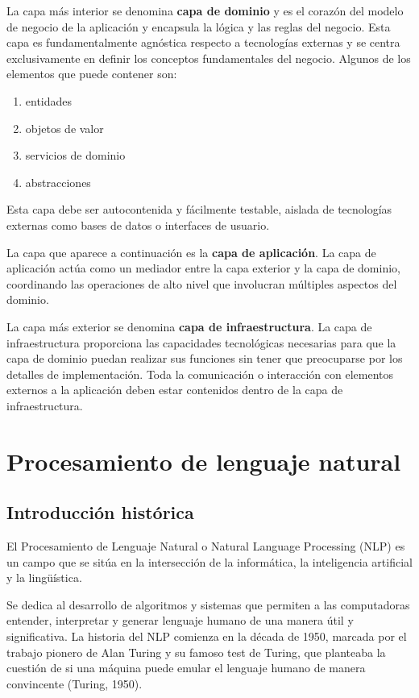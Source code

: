 La capa más interior se denomina \textbf{capa de dominio} y es el corazón del modelo de negocio de la aplicación y
encapsula la lógica y las reglas del negocio.
Esta capa es fundamentalmente agnóstica respecto a tecnologías externas y se centra exclusivamente en definir los
conceptos fundamentales del negocio.
Algunos de los elementos que puede contener son:
\begin{enumerate}
    \item entidades
    \item objetos de valor
    \item servicios de dominio
    \item abstracciones
\end{enumerate}

Esta capa debe ser autocontenida y fácilmente testable, aislada de tecnologías externas como bases de datos o
interfaces de usuario.

La capa que aparece a continuación es la \textbf{capa de aplicación}.
La capa de aplicación actúa como un mediador entre la capa exterior y la capa de dominio, coordinando las operaciones
de alto nivel que involucran múltiples aspectos del dominio.

La capa más exterior se denomina \textbf{capa de infraestructura}.
La capa de infraestructura proporciona las capacidades tecnológicas necesarias para que la capa de dominio puedan
realizar sus funciones sin tener que preocuparse por los detalles de implementación.
Toda la comunicación o interacción con elementos externos a la aplicación deben estar contenidos dentro de la capa de
infraestructura.


\section{Procesamiento de lenguaje natural}

\subsection{Introducción histórica}
El Procesamiento de Lenguaje Natural o Natural Language Processing (NLP) es un campo que se sitúa en la
intersección de la informática, la inteligencia artificial y la lingüística.

Se dedica al desarrollo de algoritmos y sistemas que permiten a las computadoras entender, interpretar y generar
lenguaje humano de una manera útil y significativa.
La historia del NLP comienza en la década de 1950, marcada por el trabajo pionero de Alan Turing y su famoso
test de Turing, que planteaba la cuestión de si una máquina puede emular el lenguaje humano de manera convincente
(Turing, 1950).

